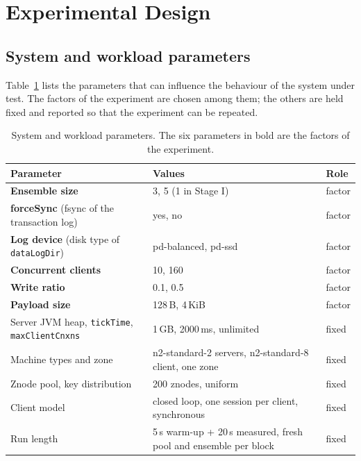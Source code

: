 
\section{Experimental Design}
\label{sec:design}

\subsection{System and workload parameters}

Table~\ref{tab:params} lists the parameters that can influence the behaviour of the system under test. The
factors of the experiment are chosen among them; the others are held fixed and reported so that the experiment
can be repeated.

\begin{table}[h]
  \centering
  \caption{System and workload parameters. The six parameters in bold are the factors of the experiment.}
  \label{tab:params}
  \small
  \begin{tabular}{@{}lll@{}}
    \toprule
    Parameter & Values & Role \\
    \midrule
    \textbf{Ensemble size} & 3, 5 (1 in Stage I) & factor \\
    \textbf{forceSync} (fsync of the transaction log) & yes, no & factor \\
    \textbf{Log device} (disk type of \texttt{dataLogDir}) & pd-balanced, pd-ssd & factor \\
    \textbf{Concurrent clients} & 10, 160 & factor \\
    \textbf{Write ratio} & 0.1, 0.5 & factor \\
    \textbf{Payload size} & 128\,B, 4\,KiB & factor \\
    Server JVM heap, \texttt{tickTime}, \texttt{maxClientCnxns} & 1\,GB, 2000\,ms, unlimited & fixed \\
    Machine types and zone & n2-standard-2 servers, n2-standard-8 client, one zone & fixed \\
    Znode pool, key distribution & 200 znodes, uniform & fixed \\
    Client model & closed loop, one session per client, synchronous & fixed \\
    Run length & 5\,s warm-up + 20\,s measured, fresh pool and ensemble per block & fixed \\
    \bottomrule
  \end{tabular}
\end{table}

